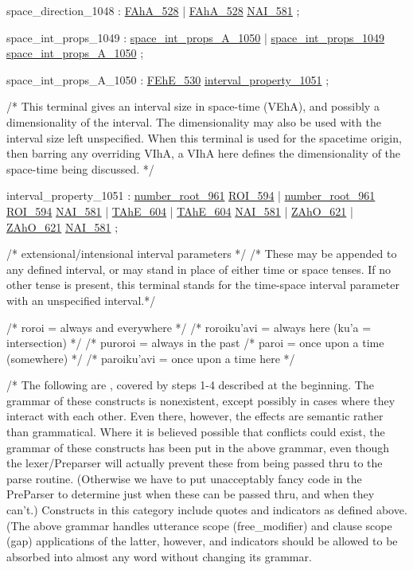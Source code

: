 \label{html:y1048}
space_direction_1048    :  \hyperref[html:y528]{FAhA_528}
                        |  \hyperref[html:y528]{FAhA_528}  \hyperref[html:y581]{NAI_581}
                        ;

\label{html:y1049}
space_int_props_1049    :  \hyperref[html:y1050]{space_int_props_A_1050}
                        |  \hyperref[html:y1049]{space_int_props_1049}  \hyperref[html:y1050]{space_int_props_A_1050}
                        ;

\label{html:y1050}
space_int_props_A_1050  : \hyperref[html:y530]{FEhE_530}  \hyperref[html:y1051]{interval_property_1051}
                        ;

/* This terminal gives an interval size in space-time (VEhA), and possibly a
   dimensionality of the interval.  The dimensionality may also be used
   with the interval size left unspecified.  When this terminal is used for the
   spacetime origin, then barring any overriding VIhA, a VIhA here defines
   the dimensionality of the space-time being discussed.                 */

\label{html:y1051}
interval_property_1051  :  \hyperref[html:y961]{number_root_961}  \hyperref[html:y594]{ROI_594}
                        |  \hyperref[html:y961]{number_root_961}  \hyperref[html:y594]{ROI_594}  \hyperref[html:y581]{NAI_581}
                        |  \hyperref[html:y604]{TAhE_604}
                        |  \hyperref[html:y604]{TAhE_604}  \hyperref[html:y581]{NAI_581}
                        |  \hyperref[html:y621]{ZAhO_621}
                        |  \hyperref[html:y621]{ZAhO_621}  \hyperref[html:y581]{NAI_581}
                        ;

/* extensional/intensional interval parameters */
/* These may be appended to any defined interval, or may stand in place of
   either time or space tenses.  If no other tense is present, this terminal
   stands for the time-space interval parameter with an unspecified interval.*/

   /* roroi = always and everywhere */
   /* roroiku'avi = always here (ku'a = intersection) */
   /* puroroi = always in the past
   /* paroi = once upon a time (somewhere) */
   /* paroiku'avi = once upon a time here */

/* The following are , covered by steps 1-4 described
   at the beginning.  The grammar of these constructs is nonexistent,
   except possibly in cases where they interact with each other.  Even
   there, however, the effects are semantic rather than grammatical.  Where
   it is believed possible that conflicts could exist, the grammar of these
   constructs has been put in the above grammar, even though the
   lexer/Preparser will actually prevent these from being passed thru to
   the parse routine.  (Otherwise we have to put unacceptably fancy code in
   the PreParser to determine just when these can be passed thru, and when
   they can't.)  Constructs in this category include quotes and indicators
   as defined above.  (The above grammar handles utterance scope
   (free_modifier) and clause scope (gap) applications of the latter,
   however, and indicators should be allowed to be absorbed into almost any
   word without changing its grammar.

